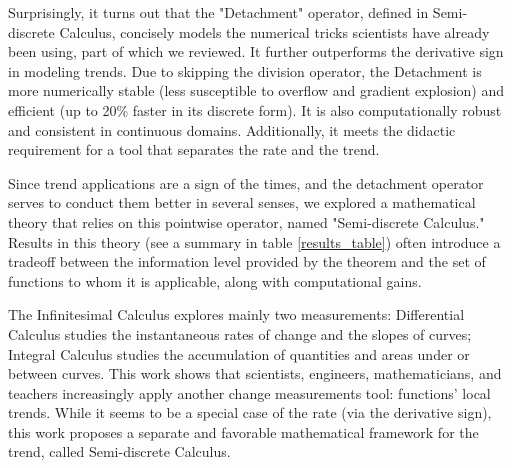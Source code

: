 \documentclass[11pt]{book}
\begin{document}
Surprisingly, it turns out that the "Detachment" operator, defined in Semi-discrete Calculus, concisely models the numerical tricks scientists have already been using, part of which we reviewed. It further outperforms the derivative sign in modeling trends. Due to skipping the division operator, the Detachment is more numerically stable (less susceptible to overflow and gradient explosion) and efficient (up to 20\% faster in its discrete form). It is also computationally robust and consistent in continuous domains. Additionally, it meets the didactic requirement for a tool that separates the rate and the trend.

Since trend applications are a sign of the times, and the detachment operator serves to conduct them better in several senses, we explored a mathematical theory that relies on this pointwise operator, named "Semi-discrete Calculus." Results in this theory (see a summary in table \ref{results_table}) often introduce a tradeoff between the information level provided by the theorem and the set of functions to whom it is applicable, along with computational gains.

The Infinitesimal Calculus explores mainly two measurements: Differential Calculus studies the instantaneous rates of change and the slopes of curves; Integral Calculus studies the accumulation of quantities and areas under or between curves. This work shows that scientists, engineers, mathematicians, and teachers increasingly apply another change measurements tool: functions' local trends. While it seems to be a special case of the rate (via the derivative sign), this work proposes a separate and favorable mathematical framework for the trend, called Semi-discrete Calculus.
\end{document}
